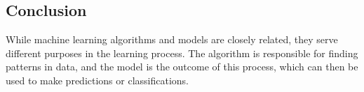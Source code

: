 \subsection*{Conclusion}
While machine learning algorithms and models are closely related, they serve different purposes in the learning process. The algorithm is responsible for finding patterns in data, and the model is the outcome of this process, which can then be used to make predictions or classifications.
